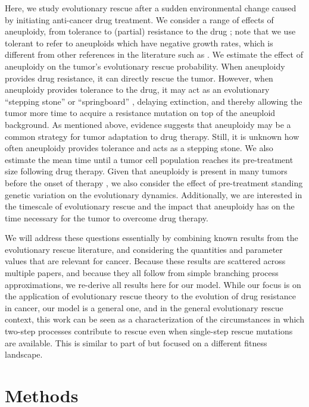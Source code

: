 \documentclass[12pt]{extarticle}
\begin{document}
Here, we study evolutionary rescue after a sudden environmental change caused by initiating anti-cancer drug treatment. 
We consider a range of effects of aneuploidy, from tolerance to (partial) resistance to the drug \citep{brauner2016distinguishing}; note that we use tolerant to refer to aneuploids which have negative growth rates, which is different from other references in the literature such as \citet{berman2020drug}. %
We estimate the effect of aneuploidy on the tumor's evolutionary rescue probability. 
When aneuploidy provides drug resistance, it can directly rescue the tumor. However, when aneuploidy provides tolerance to the drug, it may act as an evolutionary ``stepping stone'' or ``springboard'' \citep{Yona2015,martin2013probability,osmond_genetic_2020}, delaying extinction, and thereby allowing the tumor more time to acquire a resistance mutation on top of the aneuploid background. 
As mentioned above, evidence suggests that aneuploidy may be a common strategy for tumor adaptation to drug therapy. Still, it is unknown how often aneuploidy provides tolerance and acts as a stepping stone.
We also estimate the mean time until a tumor cell population reaches its pre-treatment size following drug therapy. 
Given that aneuploidy is present in many tumors before the onset of therapy \citep{lukow2021chromosomal,ben2020context}, we also consider the effect of pre-treatment standing genetic variation on the evolutionary dynamics. Additionally, we are interested in the timescale of evolutionary rescue and the impact that aneuploidy has on the time necessary for the tumor to overcome drug therapy. 

We will address these questions essentially by combining known results from the evolutionary rescue literature, and considering the quantities and parameter values that are relevant for cancer.
Because these results are scattered across multiple papers, and because they all follow from simple branching process approximations, we re-derive all results here for our model.
While our focus is on the application of evolutionary rescue theory to the evolution of drug resistance in cancer, our model is a general one, and in the general evolutionary rescue context, this work can be seen as a characterization of the circumstances in which two-step processes contribute to rescue even when single-step rescue mutations are available.
This is similar to part of \citet{osmond_genetic_2020} but focused on a different fitness landscape.


\section*{Methods}
\end{document}
